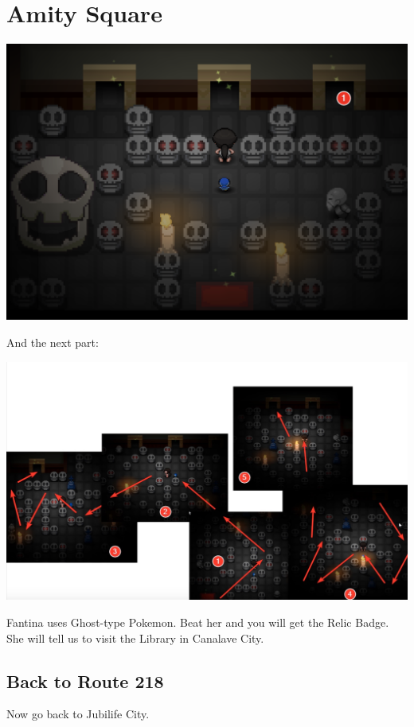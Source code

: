 \documentclass[11pt]{article}
\begin{document}
\section{Amity Square}
\label{sec:Amity_Square}


\includegraphics[width=\textwidth]{walkthrough/Sinnoh/hearthome_gym_1}

And the next part:

\includegraphics[width=\textwidth]{walkthrough/Sinnoh/hearthome_gym_2}

Fantina uses Ghost-type Pokemon.
Beat her and you will get the Relic Badge.
She will tell us to visit the Library in Canalave City.

\subsection{Back to Route 218}\label{subsec:back-to-route-218}
Now go back to Jubilife City.
\end{document}
